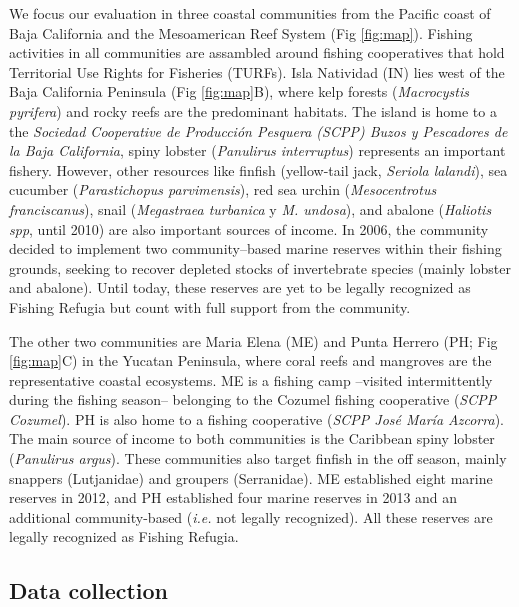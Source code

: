 \documentclass{frontiersSCNS}
\theoremstyle{definition}
\theoremstyle{definition}
\theoremstyle{definition}
\theoremstyle{remark}
\begin{document}
We focus our evaluation in three coastal communities from the Pacific
coast of Baja California and the Mesoamerican Reef System (Fig
\ref{fig:map}). Fishing activities in all communities are assambled
around fishing cooperatives that hold Territorial Use Rights for
Fisheries (TURFs). Isla Natividad (IN) lies west of the Baja California
Peninsula (Fig \ref{fig:map}B), where kelp forests (\emph{Macrocystis
pyrifera}) and rocky reefs are the predominant habitats. The island is
home to a the \emph{Sociedad Cooperative de Producción Pesquera (SCPP)
Buzos y Pescadores de la Baja California}, spiny lobster
(\emph{Panulirus interruptus}) represents an important fishery. However,
other resources like finfish (yellow-tail jack, \emph{Seriola lalandi}),
sea cucumber (\emph{Parastichopus parvimensis}), red sea urchin
(\emph{Mesocentrotus franciscanus}), snail (\emph{Megastraea turbanica}
y \emph{M. undosa}), and abalone (\emph{Haliotis spp}, until 2010) are
also important sources of income. In 2006, the community decided to
implement two community--based marine reserves within their fishing
grounds, seeking to recover depleted stocks of invertebrate species
(mainly lobster and abalone). Until today, these reserves are yet to be
legally recognized as Fishing Refugia but count with full support from
the community.

The other two communities are Maria Elena (ME) and Punta Herrero (PH;
Fig \ref{fig:map}C) in the Yucatan Peninsula, where coral reefs and
mangroves are the representative coastal ecosystems. ME is a fishing
camp --visited intermittently during the fishing season-- belonging to
the Cozumel fishing cooperative (\emph{SCPP Cozumel}). PH is also home
to a fishing cooperative (\emph{SCPP José María Azcorra}). The main
source of income to both communities is the Caribbean spiny lobster
(\emph{Panulirus argus}). These communities also target finfish in the
off season, mainly snappers (Lutjanidae) and groupers (Serranidae). ME
established eight marine reserves in 2012, and PH established four
marine reserves in 2013 and an additional community-based (\emph{i.e.}
not legally recognized). All these reserves are legally recognized as
Fishing Refugia.

\subsection{Data collection}\label{data-collection}
\end{document}
